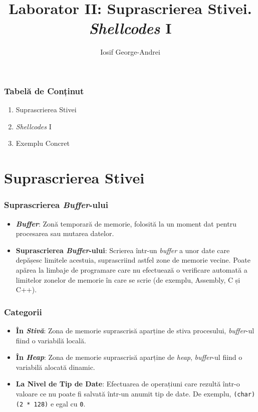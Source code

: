 \documentclass[xcolor={table}]{beamer}
\title{Laborator II: Suprascrierea Stivei. \textit{Shellcodes} I}
\subtitle{}
\author{Iosif George-Andrei}
\begin{document}
    \setcounter{showProgressBar}{0}
	\setcounter{showSlideNumbers}{0}
	\frame{\titlepage}

	\begin{frame}
		\frametitle{Tabelă de Conținut}\pause
		\begin{enumerate}[<+->]
			\item Suprascrierea Stivei
			\item \textit{Shellcodes} I
			\item Exemplu Concret
		\end{enumerate}
	\end{frame}

	\setcounter{framenumber}{0}
	\setcounter{showProgressBar}{1}
	\setcounter{showSlideNumbers}{1}
	\section{Suprascrierea Stivei}

	\begin{frame}
		\frametitle{Suprascrierea \textit{Buffer}-ului}\pause
		\begin{itemize}[<+->]
			\item \textbf{\textit{Buffer}}: Zonă temporară de memorie, folosită la un moment dat pentru procesarea sau mutarea datelor.
			\item \textbf{Suprascrierea \textit{Buffer}-ului}: Scrierea într-un \textit{buffer} a unor date care depășesc limitele acestuia, suprascriind astfel zone de memorie vecine. Poate apărea la limbaje de programare care nu efectuează o verificare automată a limitelor zonelor de memorie în care se scrie (de exemplu, Assembly, C și C++).
		\end{itemize}
	\end{frame}
	
	\begin{frame}
		\frametitle{Categorii}\pause
		\begin{itemize}[<+->]
			\item \textbf{În \textit{Stivă}}: Zona de memorie suprascrisă aparține de stiva procesului, \textit{buffer}-ul fiind o variabilă locală.
			\item \textbf{În \textit{\textit{Heap}}}: Zona de memorie suprascrisă aparține de \textit{heap}, \textit{buffer}-ul fiind o variabilă alocată dinamic.
			\item \textbf{La Nivel de Tip de Date}: Efectuarea de operațiuni care rezultă într-o valoare ce nu poate fi salvată într-un anumit tip de date. De exemplu, \texttt{(char)(2 * 128)} e egal cu \texttt{0}.
		\end{itemize}
	\end{frame}
	
\end{document}
